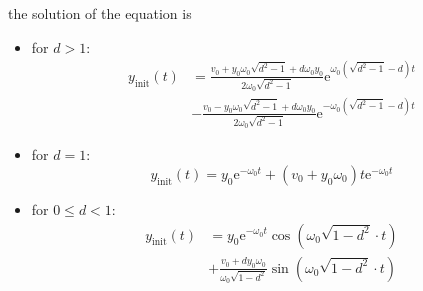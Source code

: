 \documentclass[paper=A4, pagesize, 12pt]{article}
\newcommand{\sd}{\sqrt{d^2 - 1}}
\newcommand{\sdm}{\sqrt{1-d^2}}
\begin{document}
the solution of the equation is
\begin{itemize}
  \item for $d>1$:
  \begin{align*}
    y_{\text{init}}(t) &= \frac{v_0 + y_0\omega_0 \sd + d \omega_0 y_0}{2\omega_0 \sd }
    \text{e}^{\omega_0({\sd-d})t}  \\
    &- \frac{v_0 - y_0\omega_0 \sd + d \omega_0 y_0}{2\omega_0 \sd }
    \text{e}^{-\omega_0({\sd-d})t}
  \end{align*}

  \item for $d=1$:
    \[
    y_{\text{init}}(t) = y_0 \text{e}^{-\omega_0 t} + (v_0 + y_0 \omega_0) t \text{e}^{-\omega_0 t}
    \]

  \item for $0\leq d<1$:
  \begin{align*}
    y_{\text{init}}(t) &= y_0 \text{e}^{-\omega_0 t}  \cos(\omega_0 \sdm \cdot t) \\
    &+ \frac{v_0 + d y_0 \omega_0}{\omega_0 \sdm} \sin(\omega_0 \sdm \cdot t)
  \end{align*}

\end{itemize}
\end{document}
